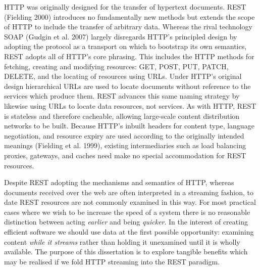 \documentclass[12pt, ]{article}
\begin{document}
HTTP was originally designed for the transfer of hypertext documents.
REST (Fielding 2000) introduces no fundamentally new methods but extends
the scope of HTTP to include the transfer of arbitrary data. Whereas the
rival technology SOAP (Gudgin et al. 2007) largely disregards HTTP's
principled design by adopting the protocol as a transport on which to
bootstrap its own semantics, REST adopts all of HTTP's core phrasing.
This includes the HTTP methods for fetching, creating and modifying
resources: GET, POST, PUT, PATCH, DELETE, and the locating of resources
using URLs. Under HTTP's original design hierarchical URLs are used to
locate documents without reference to the services which produce them.
REST advances this same naming strategy by likewise using URLs to locate
data resources, not services. As with HTTP, REST is stateless and
therefore cacheable, allowing large-scale content distribution networks
to be built. Because HTTP's inbuilt headers for content type, language
negotiation, and resource expiry are used according to the originally
intended meanings (Fielding et al. 1999), existing intermediaries such
as load balancing proxies, gateways, and caches need make no special
accommodation for REST resources.

Despite REST adopting the mechanisms and semantics of HTTP, whereas
documents received over the web are often interpreted in a streaming
fashion, to date REST resources are not commonly examined in this way.
For most practical cases where we wish to be increase the speed of a
system there is no reasonable distinction between acting \emph{earlier}
and being \emph{quicker}. In the interest of creating efficient software
we should use data at the first possible opportunity: examining content
\emph{while it streams} rather than holding it unexamined until it is
wholly available. The purpose of this dissertation is to explore
tangible benefits which may be realised if we fold HTTP streaming into
the REST paradigm.
\end{document}
